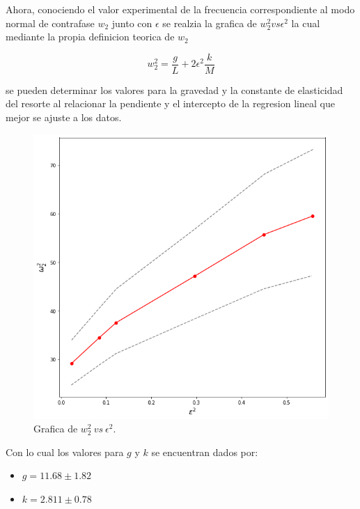 \documentclass[10pt]{article}
\begin{document}
        Ahora, conociendo el valor experimental de la frecuencia correspondiente al modo normal de contrafase $ w_2 $ junto con $ \epsilon $ se realzia la grafica de $ w_2^2 vs \epsilon^2 $ la cual mediante la propia definicion teorica de $ w_2 $

        \begin{equation}
            w_2^2 = \frac{g}{L} + 2 \epsilon^2 \frac{k}{M}
        \end{equation}

        se pueden determinar los valores para la gravedad y la constante de elasticidad del resorte al relacionar la pendiente y el intercepto de la regresion lineal que mejor se ajuste a los datos.

        \begin{figure}[H]
            \centering
            \includegraphics[scale = 0.3]{img/omaga_vs_epsilon.png}
            \caption{Grafica de $w_2^2 \: vs \: \epsilon^2$.}
        \end{figure}

        Con lo cual los valores para $g$ y $k$ se encuentran dados por:

        \begin{itemize}
            \item $g = 11.68 \pm 1.82$
            \item $k = 2.811 \pm 0.78$
        \end{itemize}
\end{document}
